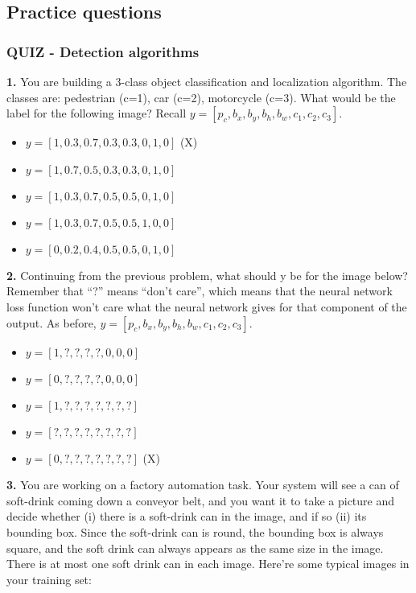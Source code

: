 \subsection{Practice questions}
\subsubsection{QUIZ - Detection algorithms}
\textbf{1.} You are building a 3-class object classification and localization algorithm. The classes are: pedestrian (c=1), car (c=2), motorcycle (c=3). What would be the label for the following image? Recall $y = [p_c, b_x, b_y, b_h, b_w, c_1, c_2, c_3]$.
\begin{itemize}
    \item $y=[1,0.3,0.7,0.3,0.3,0,1,0]$ (X)
    \item $y=[1,0.7,0.5,0.3,0.3,0,1,0]$
    \item $y=[1,0.3,0.7,0.5,0.5,0,1,0]$
    \item $y=[1,0.3,0.7,0.5,0.5,1,0,0]$
    \item $y=[0,0.2,0.4,0.5,0.5,0,1,0]$
\end{itemize}
\textbf{2.} Continuing from the previous problem, what should y be for the image below? Remember that “?” means “don’t care”, which means that the neural network loss function won’t care what the neural network gives for that component of the output. As before, $y = [p_c, b_x, b_y, b_h, b_w, c_1, c_2, c_3]$.
\begin{itemize}
    \item $y=[1,?,?,?,?,0,0,0]$
    \item $y = [0, ?, ?, ?, ?, 0, 0, 0]$
    \item $y = [1, ?, ?, ?, ?, ?, ?, ?]$
    \item $y = [?, ?, ?, ?, ?, ?, ?, ?]$
    \item $y = [0, ?, ?, ?, ?, ?, ?, ?]$ (X)
\end{itemize}
\textbf{3.} You are working on a factory automation task. Your system will see a can of soft-drink coming down a conveyor belt, and you want it to take a picture and decide whether (i) there is a soft-drink can in the image, and if so (ii) its bounding box. Since the soft-drink can is round, the bounding box is always square, and the soft drink can always appears as the same size in the image. There is at most one soft drink can in each image. Here’re some typical images in your training set:

